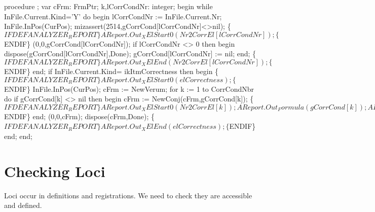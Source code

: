 procedure ;
var
   cFrm: FrmPtr;
   k,lCorrCondNr: integer;
begin
   while InFile.Current.Kind='Y' do
   begin
      lCorrCondNr := InFile.Current.Nr;
      InFile.InPos(CurPos);
      mizassert(2514,gCorrCond[lCorrCondNr]<>nil);
      \{$IFDEF ANALYZER_REPORT\}
      AReport.Out_XElStart0(Nr2CorrEl[ lCorrCondNr]);
      \{$ENDIF\}
      (0,0,gCorrCond[lCorrCondNr]);
      if lCorrCondNr <> 0 then
      begin
         dispose(gCorrCond[lCorrCondNr],Done);
         gCorrCond[lCorrCondNr] := nil;
      end;
      \{$IFDEF ANALYZER_REPORT\}
      AReport.Out_XElEnd(Nr2CorrEl[ lCorrCondNr]);
      \{$ENDIF\}
   end;
   if InFile.Current.Kind= ikItmCorrectness then
   begin
      \{$IFDEF ANALYZER_REPORT\}
      AReport.Out_XElStart0(elCorrectness);
      \{$ENDIF\}
      InFile.InPos(CurPos);
      cFrm := NewVerum;
      for k := 1 to CorrCondNbr do
         if gCorrCond[k] <> nil then
         begin
            cFrm := NewConj(cFrm,gCorrCond[k]);
            \{$IFDEF ANALYZER_REPORT\}
            AReport.Out_XElStart0(Nr2CorrEl[ k]);
            AReport.Out_Formula(gCorrCond[k]);
            AReport.Out_XElEnd(Nr2CorrEl[ k]);
            \{$ENDIF\}     
         end;
      (0,0,cFrm);
      dispose(cFrm,Done);
      \{$IFDEF ANALYZER_REPORT\}
      AReport.Out_XElEnd(elCorrectness);
      \{$ENDIF\}
   end;
end;
\eatline
{}\nwendcode{}\nwdocspar
\section{Checking Loci}

Loci occur in definitions and registrations. We need to check they are
accessible and defined.

